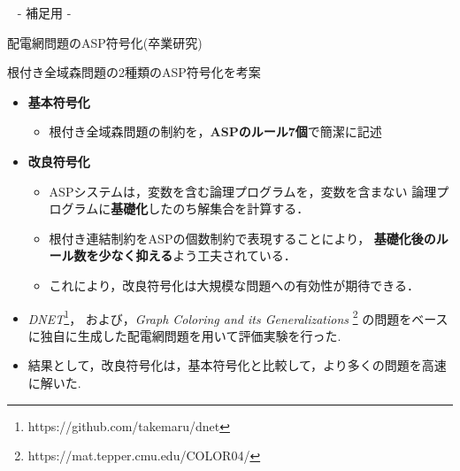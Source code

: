 \appendix
\backupbegin

\begin{frame}{~}
 \centering
 - 補足用 -
\end{frame} 

\begin{frame}{配電網問題のASP符号化(卒業研究)}
   \begin{block}{根付き全域森問題の2種類のASP符号化を考案}
     \begin{itemize}
     \item \alert{\bf 基本符号化}
       \begin{itemize}
       \item 根付き全域森問題の制約を，\textbf{ASPのルール7個}で簡潔に記述
       \end{itemize}
     \item \alert{\bf 改良符号化}
       \begin{itemize}
       \item ASPシステムは，変数を含む論理プログラムを，変数を含まない
         論理プログラムに\textbf{基礎化}したのち解集合を計算する．
       \item 根付き連結制約をASPの個数制約で表現することにより，
         \textbf{基礎化後のルール数を少なく抑える}よう工夫されている．
       \item これにより，改良符号化は大規模な問題への有効性が期待できる．
       \end{itemize}
     \end{itemize}
   \end{block}
 \begin{itemize}
  \renewcommand{\thefootnote}{\fnsymbol{footnote}}
  \setcounter{footnote}{1}
  \item \textit{DNET}\footnote{https://github.com/takemaru/dnet}，
        および，\textit{Graph Coloring and its Generalizations}
        \footnote{https://mat.tepper.cmu.edu/COLOR04/}%
        の問題をベースに独自に生成した配電網問題を用いて評価実験を行った.
  \item 結果として，改良符号化は，基本符号化と比較して，より多くの問題を高速に解いた.
 \end{itemize}
\end{frame}

